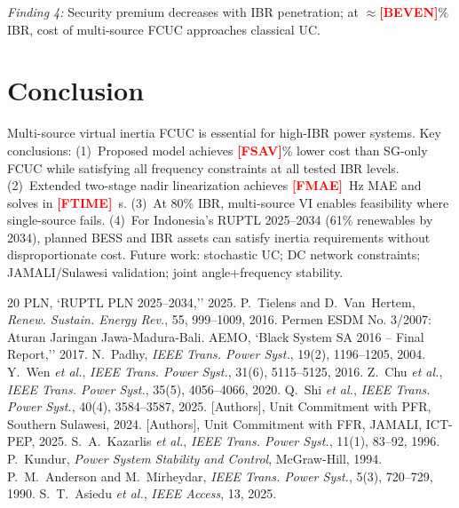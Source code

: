 \documentclass[journal]{IEEEtran}
\newcommand{\RESULT}[1]{\textcolor{red}{\textbf{[#1]}}}
\begin{document}
\textit{Finding 4:} Security premium decreases with IBR
penetration; at $\approx$\RESULT{BEVEN}\% IBR, cost of
multi-source FCUC approaches classical UC.

\section{Conclusion}
\label{sec:conclusion}

Multi-source virtual inertia FCUC is essential for
high-IBR power systems. Key conclusions:
(1)~Proposed model achieves \RESULT{FSAV}\% lower cost
than SG-only FCUC while satisfying all frequency
constraints at all tested IBR levels.
(2)~Extended two-stage nadir linearization achieves
\RESULT{FMAE}~Hz MAE and solves in \RESULT{FTIME}~s.
(3)~At 80\% IBR, multi-source VI enables feasibility
where single-source fails.
(4)~For Indonesia's RUPTL 2025--2034 (61\% renewables
by 2034), planned BESS and IBR assets can satisfy
inertia requirements without disproportionate cost.
Future work: stochastic UC; DC network constraints;
JAMALI/Sulawesi validation; joint angle+frequency stability.


\begin{thebibliography}{20}
PLN, `RUPTL PLN 2025--2034,'' 2025.
P.~Tielens and D.~Van~Hertem, \textit{Renew. Sustain. Energy Rev.}, 55, 999--1009, 2016.
Permen ESDM No. 3/2007: Aturan Jaringan Jawa-Madura-Bali.
AEMO, `Black System SA 2016 -- Final Report,'' 2017.
N.~Padhy, \textit{IEEE Trans. Power Syst.}, 19(2), 1196--1205, 2004.
Y.~Wen \textit{et al.}, \textit{IEEE Trans. Power Syst.}, 31(6), 5115--5125, 2016.
Z.~Chu \textit{et al.}, \textit{IEEE Trans. Power Syst.}, 35(5), 4056--4066, 2020.
Q.~Shi \textit{et al.}, \textit{IEEE Trans. Power Syst.}, 40(4), 3584--3587, 2025.
[Authors], Unit Commitment with PFR, Southern Sulawesi, 2024.
[Authors], Unit Commitment with FFR, JAMALI, ICT-PEP, 2025.
S.~A.~Kazarlis \textit{et al.}, \textit{IEEE Trans. Power Syst.}, 11(1), 83--92, 1996.
P.~Kundur, \textit{Power System Stability and Control}, McGraw-Hill, 1994.
P.~M.~Anderson and M.~Mirheydar, \textit{IEEE Trans. Power Syst.}, 5(3), 720--729, 1990.
S.~T.~Asiedu \textit{et al.}, \textit{IEEE Access}, 13, 2025.
\end{thebibliography}
\end{document}
